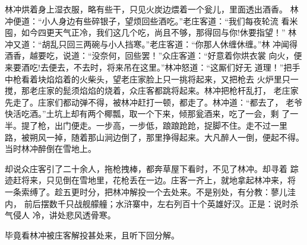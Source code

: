 林冲烘着身上湿衣服，略有些干，只见火炭边煨着一个瓮儿，里面透出酒香。
林冲便道：“小人身边有些碎银子，望烦回些酒吃。”老庄客道：“我们每夜轮流
看米囤，如今四更天气正冷，我们这几个吃，尚且不够，那得回与你!休要指望！”
林冲又道：“胡乱只回三两碗与小人挡寒。”老庄客道：“你那人休缠休缠。”林
冲闻得酒香，越要吃，说道：“没奈何，回些罢！”众庄客道：“好意着你烘衣裳
向火，便来要酒吃!去便去，不去时，将来吊在这里。”林冲怒道：“这厮们好无
道理！”把手中枪看着块焰焰着的火柴头，望老庄家脸上只一挑将起来，又把枪去
火炉里只一搅，那老庄家的髭须焰焰的烧着，众庄客都跳将起来。林冲把枪杆乱打，
老庄家先走了。庄家们都动弹不得，被林冲赶打一顿，都走了。林冲道：“都去了，
老爷快活吃酒。”土坑上却有两个椰瓢，取一个下来，倾那瓮酒来，吃了一会，剩
了一半。提了枪，出门便走。一步高，一步低，踉踉跄跄，捉脚不住。走不过一里
路，被朔风一掉，随着那山涧边倒了，那里挣得起来。大凡醉人一倒，便起不得。
当时林冲醉倒在雪地上。

却说众庄客引了二十余人，拖枪拽棒，都奔草屋下看时，不见了林冲。却寻着
踪迹赶将来，只见倒在雪地里，花枪丢在一边。庄客一齐上，就地拿起林冲来，将
一条索缚了。趁五更时分，把林冲解投一个去处来。不是别处，有分教：蓼儿洼内，
前后摆数千只战舰艨艟；水浒寨中，左右列百十个英雄好汉。正是：说时杀气侵人
冷，讲处悲风透骨寒。

毕竟看林冲被庄客解投甚处来，且听下回分解。